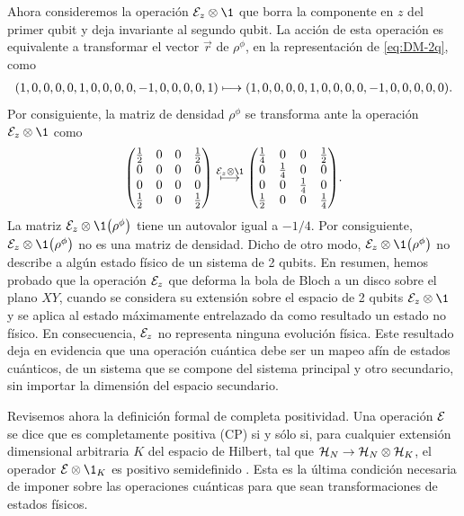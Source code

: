 Ahora consideremos la operación $\E_z\otimes\1$ que borra
la componente en $z$ del primer qubit y deja invariante 
al segundo qubit. La acción de esta operación es equivalente 
a transformar el vector $\vec{r}$ de $\rho^{\phi}$, en la representación
de \eqref{eq:DM-2q}, como
\begin{align}
\qty(1,0,0,0,0,1,0,0,0,0,-1,0,0,0,0,1)
\longmapsto
\qty(1,0,0,0,0,1,0,0,0,0,-1,0,0,0,0,0).
\end{align}
Por consiguiente, la matriz de densidad $\rho^{\phi}$ se transforma 
ante la operación $\E_z\otimes\1$ como
\begin{align}
\mqty( 
\frac{1}{2} & 0 & 0 & \frac{1}{2} \\
0 & 0 & 0 & 0 \\
0 & 0 & 0 & 0 \\
\frac{1}{2} & 0 & 0 & \frac{1}{2} \\
)
\stackrel{\E_{z}\otimes\1}{\longmapsto}
\mqty( 
\frac{1}{4} & 0 & 0 & \frac{1}{2} \\
0 & \frac{1}{4} & 0 & 0 \\
0 & 0 & \frac{1}{4} & 0 \\
\frac{1}{2} & 0 & 0 & \frac{1}{4} \\
).
\end{align}
La matriz $\E_z\otimes\1\qty(\rho^{\phi})$ tiene un autovalor igual a $-1/4$.
Por consiguiente, $\E_z\otimes\1\qty(\rho^{\phi})$ no es una matriz 
de densidad. Dicho de otro modo, $\E_z\otimes\1\qty(\rho^{\phi})$ 
no describe a algún estado físico de un sistema de 2 qubits.
En resumen, hemos probado que la operación $\mathcal{E}_z$ que deforma la bola 
de Bloch a un disco sobre el plano $XY$, cuando se considera su 
extensión sobre el espacio de 2 qubits $\E_z\otimes\1$ y se aplica al
estado máximamente entrelazado da como resultado un estado no físico. 
En consecuencia, $\mathcal{E}_z$ no representa ninguna evolución física. Este 
resultado deja en evidencia que una operación cuántica debe ser 
un mapeo afín de estados cuánticos, de un sistema que se compone del
sistema principal y otro secundario, sin importar la dimensión del
espacio secundario.


Revisemos ahora la definición formal de completa positividad.
Una operación $\mathcal{E}$ se dice que es completamente positiva (CP)
si y sólo si, para cualquier extensión dimensional arbitraria $K$ 
del espacio de Hilbert, tal que 
$\mathcal{H}_N \rightarrow \mathcal{H}_N \otimes \mathcal{H}_K$,
el operador $\E\otimes\1_K$ es positivo semidefinido 
\cite{bengtsson_zyczkowski_2017}. Esta es la última condición 
necesaria de imponer sobre las operaciones cuánticas para 
que sean transformaciones de estados físicos. 

